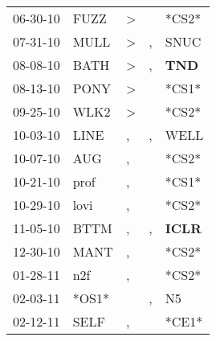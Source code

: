 \begin{supertabular}{p{0.07\textwidth}p{0.06\textwidth}p{0.02\textwidth}p{0.02\textwidth}p{0.06\textwidth}}
          06-30-10\textsuperscript{} &           FUZZ\textsuperscript{} &     \textgreater &                  &                            *CS2* \\
          07-31-10\textsuperscript{} &           MULL\textsuperscript{} &     \textgreater &                , &           SNUC\textsuperscript{} \\
          08-08-10\textsuperscript{} &           BATH\textsuperscript{} &     \textgreater &                , &   \textbf{TND\textsuperscript{}} \\
          08-13-10\textsuperscript{} &           PONY\textsuperscript{} &     \textgreater &                  &                            *CS1* \\
          09-25-10\textsuperscript{} &           WLK2\textsuperscript{} &     \textgreater &                  &                            *CS2* \\
          10-03-10\textsuperscript{} &           LINE\textsuperscript{} &                , &                , &           WELL\textsuperscript{} \\
          10-07-10\textsuperscript{} &            AUG\textsuperscript{} &                , &                  &                            *CS2* \\
          10-21-10\textsuperscript{} &           prof\textsuperscript{} &                , &                  &                            *CS1* \\
          10-29-10\textsuperscript{} &           lovi\textsuperscript{} &                , &                  &                            *CS2* \\
          11-05-10\textsuperscript{} &           BTTM\textsuperscript{} &                , &                , &  \textbf{ICLR\textsuperscript{}} \\
          12-30-10\textsuperscript{} &           MANT\textsuperscript{} &                , &                  &                            *CS2* \\
          01-28-11\textsuperscript{} &            n2f\textsuperscript{} &                , &                  &                            *CS2* \\
          02-03-11\textsuperscript{} &                            *OS1* &                  &                , &             N5\textsuperscript{} \\
          02-12-11\textsuperscript{} &           SELF\textsuperscript{} &                , &                  &                            *CE1* \\

\end{supertabular}
